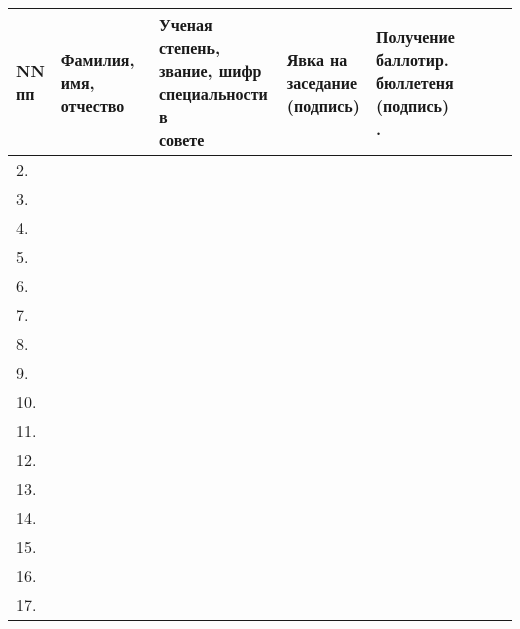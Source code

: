\begin{longtable}{|l|p{5.1cm}|p{5cm}|l|l|}
	\hline
	\thead{NN \\ пп}  & \makecell{Фамилия, имя,\\ отчество} &\makecell{Ученая степень, \\ звание, шифр \\ специальности в \\ совете}  & \thead{Явка на \\ заседание \\ (подпись)} & \thead{Получение \\ баллотир.\\ бюллетеня\\ (подпись)} \endfirsthead
	\hline
	1. &  \dcHeadFullFIO & \dcHeadRegaliaFull &  &  \\ 	\hline
	2. & \dcHeadZamFullFIO & \dcHeadZamRegaliaFull &  &  \\	\hline
	3. & \dcSecretaryFullFIO & \dcSecretaryRegaliaFull &  &  \\	\hline
	4. & \dcMemberOneFullFIO & \dcMemberOneRegaliaFull &  &  \\	\hline
	5. & \dcMemberTwoFullFIO & \dcMemberTwoRegaliaFull &  &  \\	\hline
	6. & \dcMemberThreeFullFIO & \dcMemberThreeRegaliaFull	 &  &  \\	\hline	
	7. & \dcMemberFourFullFIO & \dcMemberFourRegaliaFull &  &  \\	\hline
	8. & \dcMemberFiveFullFIO & \dcMemberFiveRegaliaFull &  &  \\	\hline
	9. & \dcMemberSixFullFIO & \dcMemberSixRegaliaFull & &  \\ \hline
	10. & \dcMemberSevenFullFIO & \dcMemberSevenRegaliaFull & &  \\	\hline
	11. & \dcMemberEightFullFIO & \dcMemberEightRegaliaFull &  &  \\ \hline
	12. & \dcMemberNineFullFIO & \dcMemberNineRegaliaFull & &  \\	\hline
	13. & \dcMemberTenFullFIO & \dcMemberTenRegaliaFull	&  &  \\	\hline
	14. & \dcMemberElevenFullFIO & \dcMemberElevenRegaliaFull & &  \\	\hline
	15. & \dcMemberTwelveFullFIO & \dcMemberTwelveRegaliaFull & &  \\	\hline
	16. & \dcMemberThirteenFullFIO & \dcMemberThirteenRegaliaFull & &  \\	\hline
	17. & \dcMemberFourteenFullFIO & \dcMemberFourteenRegaliaFull & &  \\	\hline

\end{longtable}
